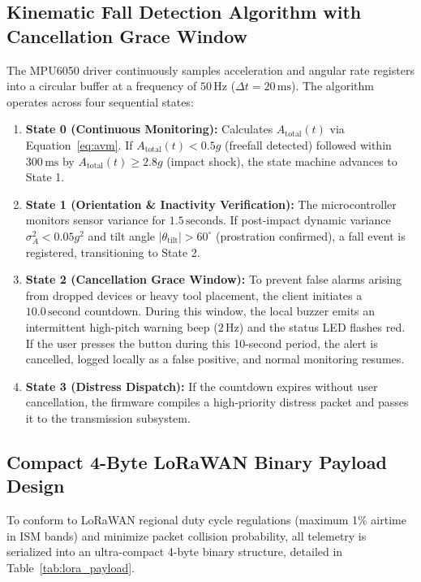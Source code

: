 \subsection{Kinematic Fall Detection Algorithm with Cancellation Grace Window}
The MPU6050 driver continuously samples acceleration and angular rate registers into a circular buffer at a frequency of $50\,\text{Hz}$ ($\Delta t = 20\,\text{ms}$). The algorithm operates across four sequential states:

\begin{enumerate}
    \item \textbf{State 0 (Continuous Monitoring):} Calculates $A_{\text{total}}(t)$ via Equation~\eqref{eq:avm}. If $A_{\text{total}}(t) < 0.5g$ (freefall detected) followed within $300\,\text{ms}$ by $A_{\text{total}}(t) \ge 2.8g$ (impact shock), the state machine advances to State 1.
    \item \textbf{State 1 (Orientation \& Inactivity Verification):} The microcontroller monitors sensor variance for $1.5\,\text{seconds}$. If post-impact dynamic variance $\sigma_A^2 < 0.05g^2$ and tilt angle $|\theta_{\text{tilt}}| > 60^\circ$ (prostration confirmed), a fall event is registered, transitioning to State 2.
    \item \textbf{State 2 (Cancellation Grace Window):} To prevent false alarms arising from dropped devices or heavy tool placement, the client initiates a $10.0\,\text{second}$ countdown. During this window, the local buzzer emits an intermittent high-pitch warning beep ($2\,\text{Hz}$) and the status LED flashes red. If the user presses the button during this 10-second period, the alert is cancelled, logged locally as a false positive, and normal monitoring resumes.
    \item \textbf{State 3 (Distress Dispatch):} If the countdown expires without user cancellation, the firmware compiles a high-priority distress packet and passes it to the transmission subsystem.
\end{enumerate}

\subsection{Compact 4-Byte LoRaWAN Binary Payload Design}
To conform to LoRaWAN regional duty cycle regulations (maximum 1\% airtime in ISM bands) and minimize packet collision probability, all telemetry is serialized into an ultra-compact 4-byte binary structure, detailed in Table~\ref{tab:lora_payload}.

